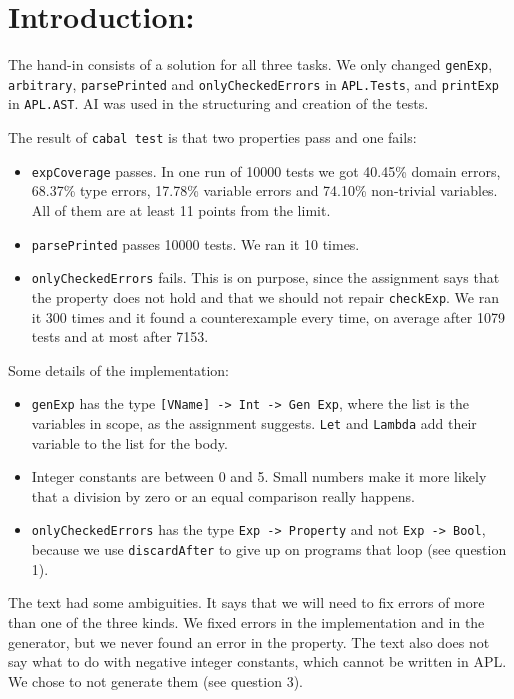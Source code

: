 \section{Introduction:}

The hand-in consists of a solution for all three tasks. We only changed \texttt{genExp}, \texttt{arbitrary}, \texttt{parsePrinted} and \texttt{onlyCheckedErrors} in \texttt{APL.Tests}, and \texttt{printExp} in \texttt{APL.AST}. AI was used in the structuring and creation of the tests.

The result of \texttt{cabal test} is that two properties pass and one fails:

\begin{itemize}
  \item \texttt{expCoverage} passes. In one run of 10000 tests we got 40.45\% domain errors, 68.37\% type errors, 17.78\% variable errors and 74.10\% non-trivial variables. All of them are at least 11 points from the limit.
  \item \texttt{parsePrinted} passes 10000 tests. We ran it 10 times.
  \item \texttt{onlyCheckedErrors} fails. This is on purpose, since the assignment says that the property does not hold and that we should not repair \texttt{checkExp}. We ran it 300 times and it found a counterexample every time, on average after 1079 tests and at most after 7153.
\end{itemize}

Some details of the implementation:

\begin{itemize}
  \item \texttt{genExp} has the type \texttt{[VName] -> Int -> Gen Exp}, where the list is the variables in scope, as the assignment suggests. \texttt{Let} and \texttt{Lambda} add their variable to the list for the body.
  \item Integer constants are between 0 and 5. Small numbers make it more likely that a division by zero or an equal comparison really happens.
  \item \texttt{onlyCheckedErrors} has the type \texttt{Exp -> Property} and not \texttt{Exp -> Bool}, because we use \texttt{discardAfter} to give up on programs that loop (see question 1).
\end{itemize}

The text had some ambiguities. It says that we will need to fix errors of more than one of the three kinds. We fixed errors in the implementation and in the generator, but we never found an error in the property. The text also does not say what to do with negative integer constants, which cannot be written in APL. We chose to not generate them (see question 3).

